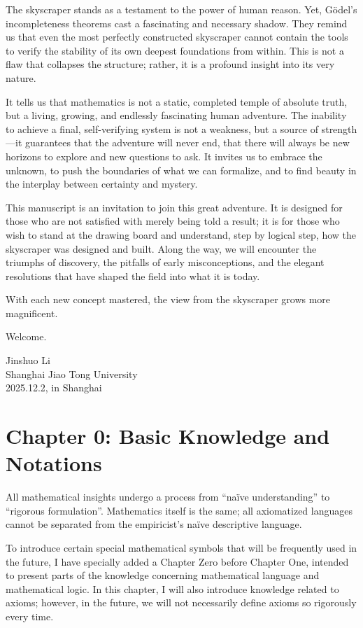\documentclass[oneside]{book}
\newcommand{\chapterzero}{%
  \cleardoublepage
  \chapter*{Chapter 0: Basic Knowledge and Notations}
  \addcontentsline{toc}{chapter}{Chapter 0: Basic Knowledge and Notations}
  \setcounter{section}{0}
  \renewcommand{\thesection}{0.\arabic{section}}
}
\begin{document}
The skyscraper stands as a testament to the power of human reason. Yet, Gödel's incompleteness theorems cast a fascinating and necessary shadow. They remind us that even the most perfectly constructed skyscraper cannot contain the tools to verify the stability of its own deepest foundations from within. This is not a flaw that collapses the structure; rather, it is a profound insight into its very nature.

It tells us that mathematics is not a static, completed temple of absolute truth, but a living, growing, and endlessly fascinating human adventure. The inability to achieve a final, self-verifying system is not a weakness, but a source of strength—it guarantees that the adventure will never end, that there will always be new horizons to explore and new questions to ask. It invites us to embrace the unknown, to push the boundaries of what we can formalize, and to find beauty in the interplay between certainty and mystery.

This manuscript is an invitation to join this great adventure. It is designed for those who are not satisfied with merely being told a result; it is for those who wish to stand at the drawing board and understand, step by logical step, how the skyscraper was designed and built. Along the way, we will encounter the triumphs of discovery, the pitfalls of early misconceptions, and the elegant resolutions that have shaped the field into what it is today.

With each new concept mastered, the view from the skyscraper grows more magnificent.

Welcome.

\begin{flushright}
Jinshuo Li \\
Shanghai Jiao Tong University \\
2025.12.2, in Shanghai
\end{flushright}

\cleardoublepage
{}
\setcounter{page}{1}
\chapterzero

All mathematical insights undergo a process from “naïve understanding” to “rigorous formulation”. Mathematics itself is the same; all axiomatized languages cannot be separated from the empiricist’s naïve descriptive language.

To introduce certain special mathematical symbols that will be frequently used in the future, I have specially added a Chapter Zero before Chapter One, intended to present parts of the knowledge concerning mathematical language and mathematical logic. In this chapter, I will also introduce knowledge related to axioms; however, in the future, we will not necessarily define axioms so rigorously every time.
\end{document}
